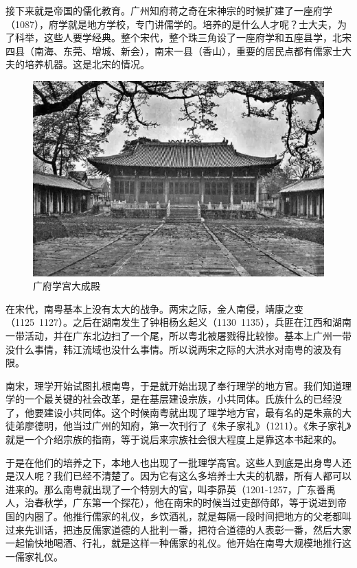 接下来就是帝国的儒化教育。广州知府蒋之奇在宋神宗的时候扩建了一座府学（1087），府学就是地方学校，专门讲儒学的。培养的是什么人才呢？士大夫，为了科举，这些人要学经典。整个宋代，整个珠三角设了一座府学和五座县学，北宋四县（南海、东莞、增城、新会），南宋一县（香山），重要的居民点都有儒家士大夫的培养机器。这是北宋的情况。

\begin{figure}
	\centering
	\includegraphics[width=\textwidth]{images/image-37}
	\caption{广府学宫大成殿}
\end{figure}

在宋代，南粤基本上没有太大的战争。两宋之际，金人南侵，靖康之变（1125~1127）。之后在湖南发生了钟相杨幺起义（1130~1135），兵匪在江西和湖南一带活动，并在广东北边扫了一个尾，所以粤北被屠戮得比较惨。基本上广州一带没什么事情，韩江流域也没什么事情。所以说两宋之际的大洪水对南粤的波及有限。

南宋，理学开始试图扎根南粤，于是就开始出现了奉行理学的地方官。我们知道理学的一个最关键的社会改革，是在基层建设宗族，小共同体。氏族什么的已经没了，他要建设小共同体。这个时候南粤就出现了理学地方官，最有名的是朱熹的大徒弟廖德明，他当过广州的知府，第一次刊行了《朱子家礼》（1211）。《朱子家礼》就是一个介绍宗族的指南，等于说后来宗族社会很大程度上是靠这本书起来的。

于是在他们的培养之下，本地人也出现了一批理学高官。这些人到底是出身粤人还是汉人呢？我们已经不清楚了。因为它有这么多培养士大夫的机器，所有人都可以进来的。那么南粤就出现了一个特别大的官，叫李昴英（1201-1257，广东番禹人，治春秋学，广东第一个探花），他在南宋的时候当过吏部侍郎，等于说进到帝国的内圈了。他推行儒家的礼仪，乡饮酒礼，就是每隔一段时间把地方的父老都叫过来先训话，把违反儒家道德的人批判一番，把符合道德的人表彰一番，然后大家一起愉快地喝酒、行礼，就是这样一种儒家的礼仪。他开始在南粤大规模地推行这一儒家礼仪。

